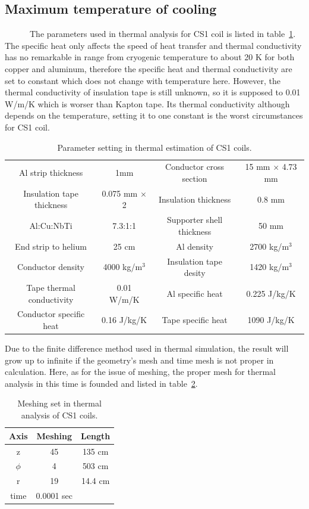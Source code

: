   \subsection{Maximum temperature of cooling}
~~~~~~The parameters used in thermal analysis for CS1 coil is listed in table~\ref{para}.
The specific heat only affects the speed of heat transfer and thermal conductivity has no remarkable in range from cryogenic temperature to about 20 K for both copper and aluminum, therefore the specific heat and thermal conductivity are set to constant which does not change with temperature here.
However, the thermal conductivity of insulation tape is still unknown, so it is supposed to 0.01 W/m/K which is worser than Kapton tape.
Its thermal conductivity although depends on the temperature, setting it to one constant is the worst circumstances for CS1 coil.
 \begin{table}[H]
  \centering
  \begin{tabular}{cccc} \hline \hline
   Al strip thickness & 1mm & Conductor cross section & 15 mm $\times$ 4.73 mm \\
   Insulation tape thickness & 0.075 mm $\times$ 2 & Insulation thickness & 0.8 mm \\
   Al:Cu:NbTi & 7.3:1:1 & Supporter shell thickness & 50 mm \\
   End strip to helium & 25 cm & Al density & 2700 kg/m$^3$ \\
   Conductor density & 4000 kg/m$^3$ & Insulation tape desity & 1420 kg/m$^3$ \\
   Tape thermal conductivity & 0.01 W/m/K & Al specific heat & 0.225 J/kg/K \\
   Conductor specific heat & 0.16 J/kg/K & Tape specific heat & 1090 J/kg/K \\ \hline \hline
  \end{tabular}
 \caption{Parameter setting in thermal estimation of CS1 coils.}
 \label{para}
 \end{table}
Due to the finite difference method used in thermal simulation, the result will grow up to infinite if the geometry's mesh and time mesh is not proper in calculation.
Here, as for the issue of meshing, the proper mesh for thermal analysis in this time is founded and listed in table~\ref{4mesh}.
 \begin{table}[H]
  \centering
  \begin{tabular}{ccc} \hline \hline
   Axis & Meshing & Length \\ \hline
   z & 45 & 135 cm \\
   $\phi$ & 4 & 503 cm \\
   r & 19 & 14.4 cm \\
   time & 0.0001 sec & \\ \hline \hline
  \end{tabular}
  \caption{Meshing set in thermal analysis of CS1 coils.}
  \label{4mesh}
 \end{table}
